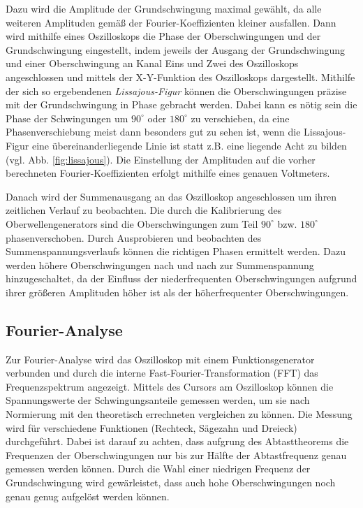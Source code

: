 		Dazu wird die Amplitude der Grundschwingung maximal gewählt,
		da alle weiteren Amplituden gemäß der Fourier-Koeffizienten kleiner ausfallen.
		Dann wird mithilfe eines Oszilloskops die Phase der Oberschwingungen und der Grundschwingung eingestellt,
		indem jeweils der Ausgang der Grundschwingung und einer Oberschwingung an Kanal Eins und Zwei
		des Oszilloskops angeschlossen und mittels der X-Y-Funktion des Oszilloskops dargestellt.
		Mithilfe der sich so ergebendenen \emph{Lissajous-Figur} können die Oberschwingungen
		präzise mit der Grundschwingung in Phase gebracht werden.
		Dabei kann es nötig sein die Phase der Schwingungen um $90^{\circ}$ oder $180^{\circ}$ zu verschieben,
		da eine Phasenverschiebung meist dann besonders gut zu sehen ist,
		wenn die Lissajous-Figur eine übereinanderliegende Linie ist statt z.B. eine liegende Acht zu bilden
		(vgl. Abb. \ref{fig:lissajous}).
		Die Einstellung der Amplituden auf die vorher berechneten Fourier-Koeffizienten erfolgt mithilfe eines genauen Voltmeters.
		
		Danach wird der Summenausgang an das Oszilloskop angeschlossen um ihren zeitlichen Verlauf zu beobachten.
		Die durch die Kalibrierung des Oberwellengenerators sind die Oberschwingungen zum Teil
		$90^{\circ}$ bzw. $180^{\circ}$ phasenverschoben. Durch Ausprobieren und beobachten des
		Summenspannungsverlaufs können die richtigen Phasen ermittelt werden.
		Dazu werden höhere Oberschwingungen nach und nach zur Summenspannung hinzugeschaltet,
		da der Einfluss der niederfrequenten Oberschwingungen aufgrund ihrer größeren Amplituden
		höher ist als der höherfrequenter Oberschwingungen.
		
	\subsection{Fourier-Analyse}
		Zur Fourier-Analyse wird das Oszilloskop mit einem Funktionsgenerator verbunden und
		durch die interne Fast-Fourier-Transformation (FFT) das Frequenzspektrum angezeigt.
		Mittels des Cursors am Oszilloskop können die Spannungswerte der Schwingungsanteile gemessen werden,
		um sie nach Normierung mit den theoretisch errechneten vergleichen zu können.
		Die Messung wird für verschiedene Funktionen (Rechteck, Sägezahn und Dreieck) durchgeführt.
		Dabei ist darauf zu achten, dass aufgrung des Abtasttheorems die Frequenzen der Oberschwingungen
		nur bis zur Hälfte der Abtastfrequenz genau gemessen werden können.
		Durch die Wahl einer niedrigen Frequenz der Grundschwingung wird gewärleistet,
		dass auch hohe Oberschwingungen noch genau genug aufgelöst werden können.

